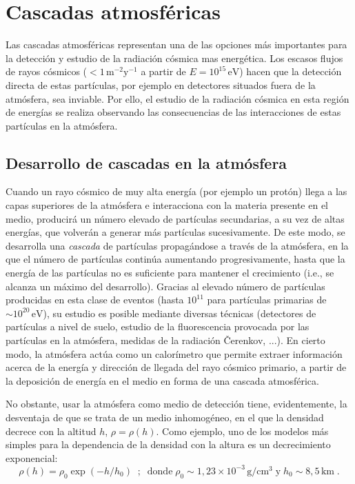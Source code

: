 \documentclass[11 pt, a4paper]{article} %
\numberwithin{equation}{section}
\numberwithin{figure}{section}
\numberwithin{table}{section}
\begin{document}
	\section{Cascadas atmosféricas}\label{sec2}
%	
%	

Las cascadas atmosféricas representan una de las opciones más importantes para la detección y estudio de la radiación cósmica mas energética. Los escasos flujos de rayos cósmicos ($<1\,\mathrm{m^{-2}y^{-1}}$ a partir de $E=10^{15}\,\mathrm{eV}$) hacen que la detección directa de estas partículas, por ejemplo en detectores situados fuera de la atmósfera, sea inviable. Por ello, el estudio de la radiación cósmica en esta región de energías se realiza observando las consecuencias de las interacciones de estas partículas en la atmósfera. 


\subsection{Desarrollo de cascadas en la atmósfera}\label{sec21}

Cuando un rayo cósmico de muy alta energía (por ejemplo un protón) llega a las capas superiores de la atmósfera e interacciona con la materia presente en el medio, producirá un número elevado de partículas secundarias, a su vez de altas energías, que volverán a generar más partículas sucesivamente. De este modo, se desarrolla una \textit{cascada} de partículas propagándose a través de la atmósfera, en la que el número de partículas continúa aumentando progresivamente, hasta que la energía de las partículas no es suficiente para mantener el crecimiento (i.e., se alcanza un máximo del desarrollo). Gracias al elevado número de partículas producidas en esta clase de eventos (hasta $10^{11}$ para partículas primarias de $\sim 10^{20}\,\mathrm{eV}$), su estudio es posible mediante diversas técnicas (detectores de partículas a nivel de suelo, estudio de la fluorescencia provocada por las partículas en la atmósfera, medidas de la radiación \v{C}erenkov, ...). En cierto modo, la atmósfera actúa como un calorímetro que permite extraer información acerca de la energía y dirección de llegada del rayo cósmico primario, a partir de la deposición de energía en el medio en forma de una cascada atmosférica.

No obstante, usar la atmósfera como medio de detección tiene, evidentemente, la desventaja de que se trata de un medio inhomogéneo, en el que la densidad decrece con la altitud $h$, $\rho = \rho(h)$. Como ejemplo, uno de los modelos más simples para la dependencia de la densidad con la altura es un decrecimiento exponencial:
\begin{equation}
	\rho(h)=\rho_0\exp\left(-h/h_0\right)\; \;;\;\;\text{donde}\;\rho_0\sim1,23\times 10^{-3}\,\mathrm{g/cm^3}\;\text{y}\;h_0\sim8,5\,\mathrm{km}\;.\label{ec21}
\end{equation}
\end{document}
